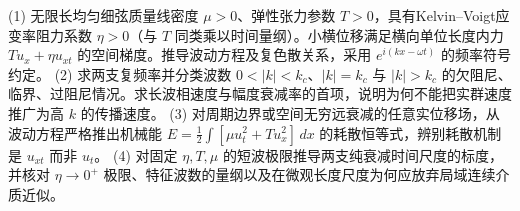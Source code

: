 (1) 无限长均匀细弦质量线密度 \(\mu>0\)、弹性张力参数 \(T>0\)，具有Kelvin–Voigt应变率阻力系数 \(\eta>0\)（与 \(T\) 同类乘以时间量纲）。小横位移满足横向单位长度内力 \(T u_x+\eta u_{xt}\) 的空间梯度。推导波动方程及复色散关系，采用 \(e^{i(kx-\omega t)}\) 的频率符号约定。
(2) 求两支复频率并分类波数 \(0<|k|<k_c\)、\(|k|=k_c\) 与 \(|k|>k_c\) 的欠阻尼、临界、过阻尼情况。求长波相速度与幅度衰减率的首项，说明为何不能把实群速度推广为高 \(k\) 的传播速度。
(3) 对周期边界或空间无穷远衰减的任意实位移场，从波动方程严格推出机械能
\(E=\frac12\int[\mu u_t^2+Tu_x^2]\,dx\) 的耗散恒等式，辨别耗散机制是 \(u_{xt}\) 而非 \(u_t\)。
(4) 对固定 \(\eta,T,\mu\) 的短波极限推导两支纯衰减时间尺度的标度，并核对 \(\eta\to0^+\) 极限、特征波数的量纲以及在微观长度尺度为何应放弃局域连续介质近似。
